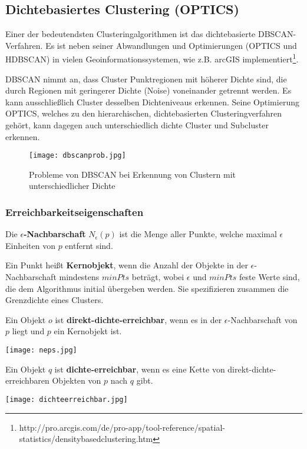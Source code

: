 \documentclass[11pt,ceqn]{book}
\begin{document}
\subsection{Dichtebasiertes Clustering (OPTICS)}
Einer der bedeutendsten Clusteringalgorithmen ist das dichtebasierte DBSCAN-Verfahren. Es ist neben seiner Abwandlungen und Optimierungen (OPTICS und HDBSCAN) in vielen Geoinformationssystemen, wie z.B. arcGIS implementiert\footnote{http://pro.arcgis.com/de/pro-app/tool-reference/spatial-statistics/densitybasedclustering.htm}. 

DBSCAN nimmt an, dass Cluster Punktregionen mit höherer Dichte sind, die durch Regionen mit geringerer Dichte (Noise) voneinander getrennt werden. Es kann ausschließlich Cluster desselben Dichteniveaus erkennen. Seine Optimierung OPTICS, welches zu den hierarchischen, dichtebasierten Clusteringverfahren gehört, kann dagegen auch unterschiedlich dichte Cluster und Subcluster erkennen.

\begin{figure}[H]
\centering
\texttt{[image: dbscanprob.jpg]}
\caption{Probleme von DBSCAN bei Erkennung von Clustern mit unterschiedlicher Dichte}
\label{dbscan_problems}
\end{figure}

\subsubsection{Erreichbarkeitseigenschaften \cite{dbscan}}
Die \textbf{$\epsilon$-Nachbarschaft} $N_\epsilon(p)$ ist die Menge aller Punkte, welche maximal $\epsilon$ Einheiten von $p$ entfernt sind.
 
Ein Punkt heißt \textbf{Kernobjekt}, wenn die Anzahl der Objekte in der $\epsilon$-Nachbarschaft mindestens $minPts$ beträgt, wobei $\epsilon$ und $minPts$ feste Werte sind, die dem Algorithmus initial übergeben werden. Sie spezifizieren zusammen die Grenzdichte eines Clusters.

\begin{minipage}{0.6\textwidth}\raggedright
Ein Objekt $o$ ist \textbf{direkt-dichte-erreichbar}, wenn es in der $\epsilon$-Nachbarschaft von $p$ liegt und $p$ ein Kernobjekt ist.
\end{minipage}
\hfill
\begin{minipage}{0.3\textwidth}
\texttt{[image: neps.jpg]}
\end{minipage}


\begin{minipage}{0.6\textwidth}\raggedright
Ein Objekt $q$ ist \textbf{dichte-erreichbar}, wenn es eine Kette von direkt-dichte-erreichbaren Objekten von $p$ nach $q$ gibt.
\end{minipage}
\hfill
\begin{minipage}{0.3\textwidth}
\texttt{[image: dichteerreichbar.jpg]}
\end{minipage}
\end{document}
